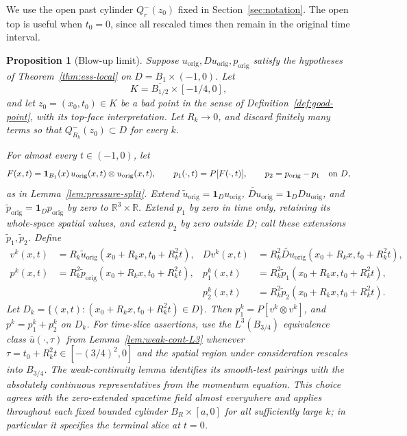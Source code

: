 \documentclass[11pt,letterpaper]{article}
\numberwithin{equation}{section}
\theoremstyle{plain}
\newtheorem{proposition}[theorem]{Proposition}
\theoremstyle{definition}
\theoremstyle{remark}
\begin{document}
We use the open past cylinder $Q_r^-(z_0)$ fixed in Section~\ref{sec:notation}.
The open top is useful when \(t_0=0\), since all rescaled times then remain in the original time interval.

\begin{proposition}[Blow-up limit]\label{prop:blowup-limit}
Suppose \(u_{\mathrm{orig}},Du_{\mathrm{orig}},p_{\mathrm{orig}}\) satisfy the hypotheses of Theorem~\ref{thm:ess-local} on \(D=B_1\times(-1,0)\). Let
\begin{equation*}
 K=\overline{B_{1/2}}\times[-1/4,0],
\end{equation*}
and let \(z_0=(x_0,t_0)\in K\) be a bad point in the sense of Definition~\ref{def:good-point}, with its top-face interpretation. Let \(R_k\to0\), and discard finitely many terms so that \(Q_{R_k}^-(z_0)\subset D\) for every \(k\).

For almost every \(t\in(-1,0)\), let
\begin{equation*}
 F(x,t)=\mathbf 1_{B_1}(x)\,u_{\mathrm{orig}}(x,t)\otimes u_{\mathrm{orig}}(x,t),\qquad
 p_1(\cdot,t)=P[F(\cdot,t)],\qquad p_2=p_{\mathrm{orig}}-p_1\quad\hbox{on }D,
\end{equation*}
as in Lemma~\ref{lem:pressure-split}. Extend \(\tilde u_{\mathrm{orig}}=\mathbf1_Du_{\mathrm{orig}}\), \(\widetilde{Du}_{\mathrm{orig}}=\mathbf1_DDu_{\mathrm{orig}}\), and \(\tilde p_{\mathrm{orig}}=\mathbf1_Dp_{\mathrm{orig}}\) by zero to \(\mathbb R^3\times\mathbb R\). Extend \(p_1\) by zero in time only, retaining its whole-space spatial values, and extend \(p_2\) by zero outside \(D\); call these extensions \(\tilde p_1,\tilde p_2\). Define
\begin{align*}
 v^k(x,t)&=R_k\tilde u_{\mathrm{orig}}(x_0+R_kx,t_0+R_k^2t),&
 Dv^k(x,t)&=R_k^2\widetilde{Du}_{\mathrm{orig}}(x_0+R_kx,t_0+R_k^2t),\\
 p^k(x,t)&=R_k^2\tilde p_{\mathrm{orig}}(x_0+R_kx,t_0+R_k^2t),&
 p_1^k(x,t)&=R_k^2\tilde p_1(x_0+R_kx,t_0+R_k^2t),\\
 &&p_2^k(x,t)&=R_k^2\tilde p_2(x_0+R_kx,t_0+R_k^2t).
\end{align*}
Let \(D_k=\{(x,t):(x_0+R_kx,t_0+R_k^2t)\in D\}\). Then \(p_1^k=P[v^k\otimes v^k]\), and \(p^k=p_1^k+p_2^k\) on \(D_k\). For time-slice assertions, use the \(L^3(B_{3/4})\) equivalence class \(\bar u(\cdot,\tau)\) from Lemma~\ref{lem:weak-cont-L3} whenever \(\tau=t_0+R_k^2t\in[-(3/4)^2,0]\) and the spatial region under consideration rescales into \(B_{3/4}\). The weak-continuity lemma identifies its smooth-test pairings with the absolutely continuous representatives from the momentum equation. This choice agrees with the zero-extended spacetime field almost everywhere and applies throughout each fixed bounded cylinder \(B_R\times[a,0]\) for all sufficiently large \(k\); in particular it specifies the terminal slice at \(t=0\).


\end{proposition}
\end{document}
